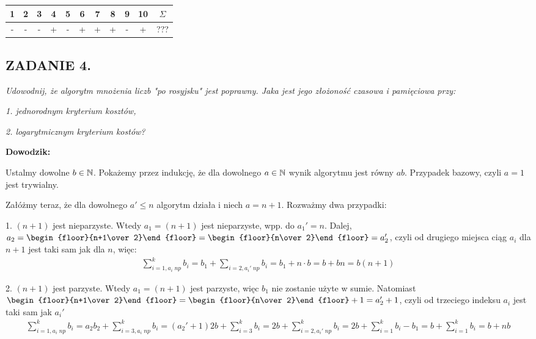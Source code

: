 \documentclass{article}
\begin{document}
\begin{center}\begin{tabular}{| c | c | c | c | c | c | c | c | c | c | c |}
    \hline

    1 & 2 & 3 & 4 & 5 & 6 & 7 & 8 & 9 & 10 & $\Sigma$\\

    \hline

    - & - & - & + & - & + & + & + & - & + & ???\\

    \hline
\end{tabular}\end{center}

\subsection*{ZADANIE 4.}
\emph{Udowodnij, że algorytm mnożenia liczb "po rosyjsku" jest poprawny. Jaka jest jego złożoność czasowa i pamięciowa przy:}

\emph{1. jednorodnym kryterium kosztów,}

\emph{2. logarytmicznym kryterium kostów?}
\medskip

\textbf{Dowodzik:}

Ustalmy dowolne $b\in\mathbb{N}$. Pokażemy przez indukcję, że dla dowolnego $a\in\mathbb{N}$ wynik algorytmu jest równy $ab$. Przypadek bazowy, czyli $a=1$ jest trywialny. 

Załóżmy teraz, że dla dowolnego $a'\leq n$ algorytm działa i niech $a=n+1$. Rozważmy dwa przypadki:

1. $(n+1)$ jest nieparzyste. Wtedy $a_1=(n+1)$ jest nieparzyste, wpp. do $a_1'=n$. Dalej, $a_2=\begin{floor}{n+1\over 2}\end{floor}=\begin{floor}{n\over 2}\end{floor}=a_2'$, czyli od drugiego miejsca ciąg $a_i$ dla $n+1$ jest taki sam jak dla $n$, więc:
\begin{align*}
    \sum\limits_{i=1,a_i \;np}^kb_i=b_1+\sum\limits_{i=2,a_i'\; np} b_i=b_1+n\cdot b=b+bn=b(n+1)
\end{align*}

2. $(n+1)$ jest parzyste. Wtedy $a_1=(n+1)$ jest parzyste, więc $b_1$ nie zostanie użyte w sumie. Natomiast $\begin{floor}{n+1\over 2}\end{floor}=\begin{floor}{n\over 2}\end{floor}+1=a_2'+1$, czyli od trzeciego indeksu $a_i$ jest taki sam jak $a_i'$
\begin{align*}
    \sum\limits_{i=1, a_i \;np}^kb_i=a_2b_2+\sum\limits_{i=3,a_i\;np}^kb_i=(a_2'+1)2b+\sum\limits_{i=3}^k b_i=2b+\sum\limits_{i=2,a_i'\;np}^kb_i=2b+\sum\limits_{i=1}^kb_i-b_1=b+\sum\limits_{i=1}^kb_i=b+nb
\end{align*}
\end{document}
